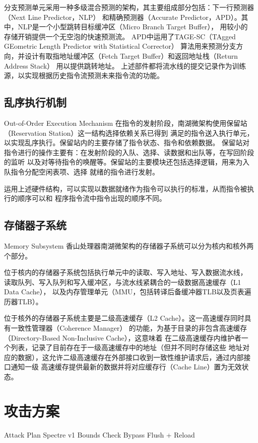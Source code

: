 分支预测单元采用一种多级混合预测的架构，其主要组成部分包括：下一行预测器（Next Line Predictor，NLP）
和精确预测器（Accurate Predictor，APD）。其中，NLP是一个小型跳转目标缓冲区（Micro Branch Target Buffer），
用较小的存储开销提供一个无空泡的快速预测流。
APD中运用了TAGE-SC（TAgged GEometric Length Predictor with Statistical Corrector）
算法用来预测分支方向，并设计有取指地址缓冲区（Fetch Target Buffer）和返回地址栈（Return Address Stack）
用以提供跳转地址。
上述部件都将流水线的提交记录作为训练源，以实现根据历史指令流预测未来指令流的功能。

\subsection{乱序执行机制}{Out-of-Order Execution Mechanism}
在指令的发射阶段，南湖微架构使用保留站（Reservation Station）这一结构选择依赖关系已得到
满足的指令送入执行单元，以实现乱序执行。保留站内的主要存储了指令状态、指令和依赖数据。
保留站对指令进行的操作主要有：在发射阶段的入队、选择、读数据和出队等，在写回阶段的监听
以及对等待指令的唤醒等。保留站的主要模块还包括选择逻辑，用来为入队指令分配空闲表项、选择
就绪的指令进行发射。

运用上述硬件结构，可以实现以数据就绪作为指令可以执行的标准，从而指令被执行的顺序可以和
程序指令流中指令出现的顺序不同。

\subsection{存储器子系统}{Memory Subsystem}
香山处理器南湖微架构的存储器子系统可以分为核内和核外两个部分。

位于核内的存储器子系统包括执行单元中的读取、写入地址、写入数据流水线，
读取队列、写入队列和写入缓冲区，与流水线紧耦合的一级数据高速缓存（L1 Data Cache），
以及内存管理单元（MMU，包括转译后备缓冲器TLB以及页表遍历器TLB）。

位于核外的存储器子系统主要是二级高速缓存（L2 Cache）。这一高速缓存同时具有一致性管理器（Coherence Manager）
的功能，为基于目录的非包含高速缓存（Directory-Based Non-Inclusive Cache），这意味着
在二级高速缓存内维护者一个列表，记录了目前存在于一级高速缓存中的地址（但并不同时存储这些
地址对应的数据），这允许二级高速缓存在外部接口收到一致性维护请求后，通过内部接口通知一级
高速缓存提供最新的数据并将对应缓存行（Cache Line）置为无效状态。


\section{攻击方案}{Attack Plan}
Spectre v1 Bounds Check Bypass
Flush + Reload
\somewords


